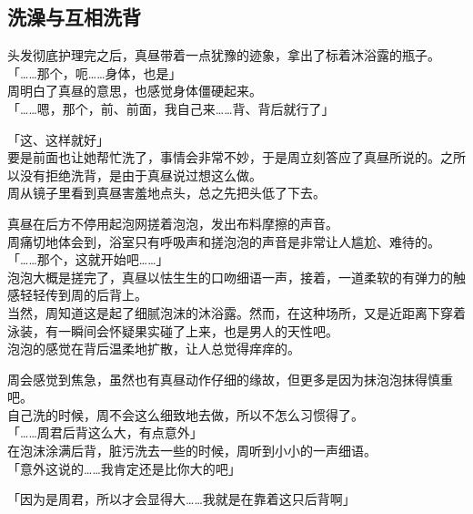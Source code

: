 \subsection{洗澡与互相洗背}

头发彻底护理完之后，真昼带着一点犹豫的迹象，拿出了标着沐浴露的瓶子。\\

「……那个，呃……身体，也是」\\

周明白了真昼的意思，也感觉身体僵硬起来。\\

「……嗯，那个，前、前面，我自己来……背、背后就行了」

「这、这样就好」\\

要是前面也让她帮忙洗了，事情会非常不妙，于是周立刻答应了真昼所说的。之所以没有拒绝洗背，是由于真昼说过想这么做。\\

周从镜子里看到真昼害羞地点头，总之先把头低了下去。

真昼在后方不停用起泡网搓着泡泡，发出布料摩擦的声音。\\

周痛切地体会到，浴室只有呼吸声和搓泡泡的声音是非常让人尴尬、难待的。\\

「……那个，这就开始吧……」\\

泡泡大概是搓完了，真昼以怯生生的口吻细语一声，接着，一道柔软的有弹力的触感轻轻传到周的后背上。\\

当然，周知道这是起了细腻泡沫的沐浴露。然而，在这种场所，又是近距离下穿着泳装，有一瞬间会怀疑果实碰了上来，也是男人的天性吧。\\

泡泡的感觉在背后温柔地扩散，让人总觉得痒痒的。

周会感觉到焦急，虽然也有真昼动作仔细的缘故，但更多是因为抹泡泡抹得慎重吧。\\

自己洗的时候，周不会这么细致地去做，所以不怎么习惯得了。\\

「……周君后背这么大，有点意外」\\

在泡沫涂满后背，脏污洗去一些的时候，周听到小小的一声细语。\\

「意外这说的……我肯定还是比你大的吧」

「因为是周君，所以才会显得大……我就是在靠着这只后背啊」\\

